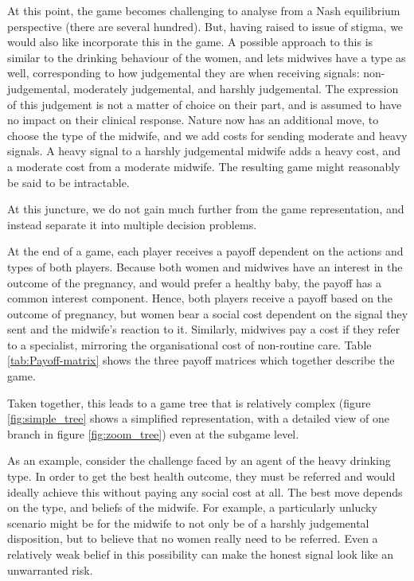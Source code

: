 At this point, the game becomes challenging to analyse from a Nash equilibrium perspective (there are several hundred). But, having raised to issue of stigma, we would also like incorporate this in the game. A possible approach to this is similar to the drinking behaviour of the women, and lets midwives have a type as well, corresponding to how judgemental they are when receiving signals: non-judgemental, moderately judgemental, and harshly judgemental. The expression of this judgement is not a matter of choice on their part, and is assumed to have no impact on their clinical response. Nature now has an additional move, to choose the type of the midwife, and we add costs for sending moderate and heavy signals. A heavy signal to a harshly judgemental midwife adds a heavy cost, and a moderate cost from a moderate midwife. The resulting game might reasonably be said to be intractable.

At this juncture, we do not gain much further from the game representation, and instead separate it into multiple decision problems.

At the end of a game, each player receives a payoff dependent on the actions and types of both players. Because both women and midwives have an interest in the outcome of the pregnancy, and would prefer a healthy baby, the payoff has a common interest component. Hence, both players receive a payoff based on the outcome of pregnancy, but women bear a social cost dependent on the signal they sent and the midwife's reaction to it. Similarly, midwives pay a cost if they refer to a specialist, mirroring the organisational cost of non-routine care. Table \ref{tab:Payoff-matrix} shows the three payoff matrices which together describe the game.



Taken together, this leads to a game tree that is relatively complex (figure \ref{fig:simple_tree} shows a simplified representation, with a detailed view of one branch in figure \ref{fig:zoom_tree}) even at the subgame level. 

As an example, consider the challenge faced by an agent of the heavy drinking type. In order to get the best health outcome, they must be referred and would ideally achieve this without paying any social cost at all. The best move depends on the type, and beliefs of the midwife. For example, a particularly unlucky scenario might be for the midwife to not only be of a harshly judgemental disposition, but to believe that no women really need to be referred. Even a relatively weak belief in this possibility can make the honest signal look like an unwarranted risk.

